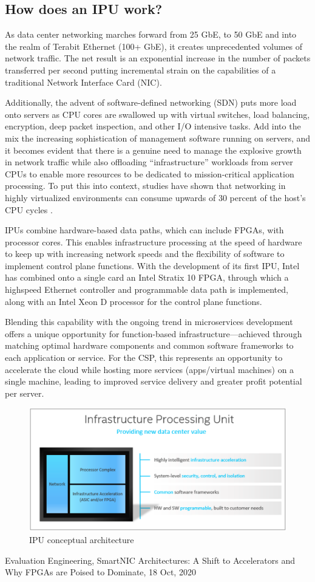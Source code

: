 \documentclass[../sn.tex]{subfiles}
\begin{document}
\subsection{How does an IPU work?}
As data center networking marches forward from 25 GbE, to 50
GbE and into the realm of Terabit Ethernet (100+ GbE), it creates
unprecedented volumes of network traffic. The net result is an
exponential increase in the number of packets transferred per
second putting incremental strain on the capabilities of a traditional
Network Interface Card (NIC).

Additionally, the advent of software-defined networking (SDN)
puts more load onto servers as CPU cores are swallowed up with
virtual switches, load balancing, encryption, deep packet
inspection, and other I/O intensive tasks.
Add into the mix the increasing sophistication of management
software running on servers, and it becomes evident that there
is a genuine need to manage the explosive growth in network
traffic while also offloading “infrastructure” workloads from
server CPUs to enable more resources to be dedicated to
mission-critical application processing.
To put this into context, studies have shown that networking in
highly virtualized environments can consume upwards of 30
percent of the host's CPU cycles \cite{evaleng}.

IPUs combine hardware-based data paths, which can include
FPGAs, with processor cores. This enables infrastructure processing
at the speed of hardware to keep up with increasing network speeds
and the flexibility of software to implement control plane functions.
With the development of its first IPU, Intel has combined onto a
single card an Intel Stratix 10 FPGA, through which a highspeed Ethernet controller and programmable data path is
implemented, along with an Intel Xeon D processor for the
control plane functions.

Blending this capability with the ongoing trend in microservices
development offers a unique opportunity for function-based
infrastructure—achieved through matching optimal hardware
components and common software frameworks to each
application or service. For the CSP, this represents an opportunity to accelerate the
cloud while hosting more services (apps/virtual machines) on a
single machine, leading to improved service delivery and greater
profit potential per server.

\begin{figure}[h!]
    \centering
    \includegraphics[width=\textwidth]{images/ipu2.png}
    \caption{IPU conceptual architecture}
\end{figure}


\begin{thebibliography}{1}
    Evaluation Engineering, SmartNIC Architectures: A Shift to Accelerators and Why FPGAs are Poised to Dominate, 18 Oct, 2020
\end{thebibliography}
\end{document}
